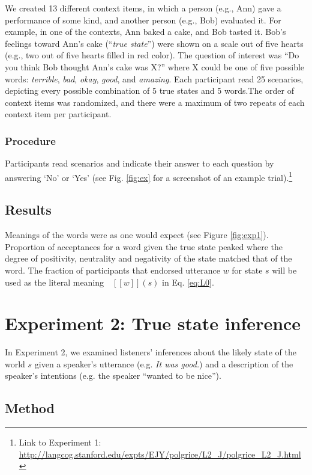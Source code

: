 \documentclass[10pt,letterpaper]{article}
\newcommand{\denote}[1]{\mbox{ $[\![ #1 ]\!]$}}
\begin{document}
We created 13 different context items, in which a person (e.g., Ann) gave a performance of some kind, and another person (e.g., Bob) evaluated it. For example, in one of the contexts, Ann baked a cake, and Bob tasted it. Bob's feelings toward Ann's cake (``\emph{true state}'') were shown on a scale out of five hearts (e.g., two out of five hearts filled in red color). The question of interest was ``Do you think Bob thought Ann's cake was X?'' where X could be one of five possible words: \emph{terrible}, \emph{bad}, \emph{okay}, \emph{good}, and \emph{amazing}. Each participant read 25 scenarios, depicting every possible combination of 5 true states and 5 words.The order of context items was randomized, and there were a maximum of two repeats of each context item per participant.

\subsubsection{Procedure}

Participants read scenarios and indicate their answer to each question by answering `No' or `Yes' (see Fig. \ref{fig:ex} for a screenshot of an example trial).\footnote{Link to Experiment 1: \url{http://langcog.stanford.edu/expts/EJY/polgrice/L2_J/polgrice_L2_J.html}}

\subsection{Results}

Meanings of the words were as one would expect (see Figure \ref{fig:exp1}).
Proportion of acceptances for a word given the true state peaked where the degree of positivity, neutrality and negativity of the state matched that of the word.
The fraction of participants that endorsed utterance $w$ for state $s$ will be used as the literal meaning $\denote{w}(s)$ in Eq. \ref{eq:L0}.


\section{Experiment 2: True state inference}

In Experiment 2, we examined listeners' inferences about the likely state of the world $s$ given a speaker's utterance (e.g. \emph{It was good.}) and a description of the speaker's intentions (e.g. the speaker ``wanted to be nice'').

\subsection{Method}
\end{document}
